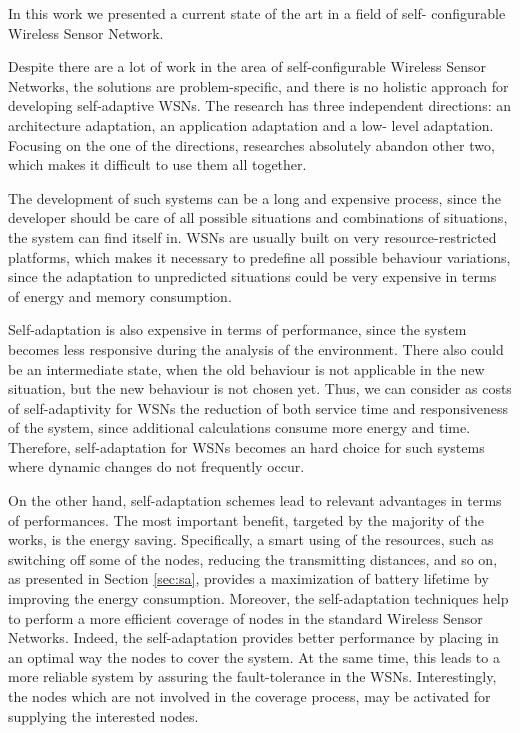 In this work we presented a current state of the art in a field of self-
configurable Wireless Sensor Network. 

Despite there are a lot of work in the area of self-configurable Wireless
Sensor Networks, the solutions are problem-specific, and there is no holistic
approach for developing self-adaptive WSNs. The research has three independent
directions: an architecture adaptation, an application adaptation and a low-
level adaptation. Focusing on the one of the directions, researches absolutely
abandon other two, which makes it difficult to use them all together.

The development of such systems can be a long and expensive process, since
the developer should be care of all possible situations and combinations of
situations, the system can find itself in. WSNs are usually built on very
resource-restricted platforms, which makes it necessary to predefine all
possible behaviour variations, since the adaptation to unpredicted situations
could be very expensive in terms of energy and memory consumption.

Self-adaptation is also expensive in terms of performance, since the system
becomes less responsive during the analysis of the environment. There also could
be an intermediate state, when the old behaviour is not applicable in the new
situation, but the new behaviour is not chosen yet. Thus, we can consider as costs of self-adaptivity for WSNs the reduction of both service time and responsiveness of the
system, since additional calculations consume more energy and time. Therefore, self-adaptation for WSNs becomes an hard choice for such systems where dynamic changes do not frequently occur. 

On the other hand, self-adaptation schemes lead to relevant advantages in terms of performances. The most important benefit, targeted by the majority of the works, is the energy saving. Specifically, a smart using of the resources, such as switching off some of the nodes, reducing the transmitting distances, and so on, as presented in Section \ref{sec:sa}, provides a maximization of battery lifetime by improving the energy consumption. Moreover, the self-adaptation techniques help to perform a more efficient coverage of nodes in the standard Wireless Sensor Networks. Indeed, the self-adaptation provides better performance by placing in an optimal way the nodes to cover the system. At the same time, this leads to a more reliable system by assuring the fault-tolerance in the WSNs. Interestingly, the nodes which are not involved in the coverage process, may be activated for supplying the interested nodes.


